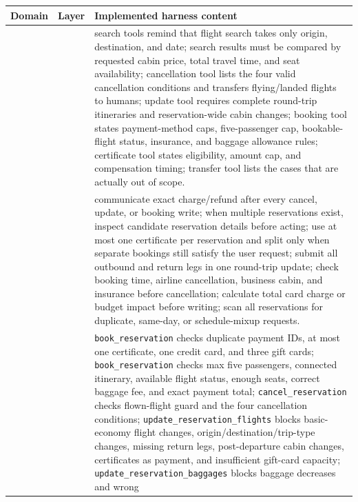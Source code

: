 \begin{table}[t]
\centering
\huge
\scriptsize
\setlength{\tabcolsep}{2.2pt}
\renewcommand{\arraystretch}{0.88}
\begin{tabular}{>{\centering\arraybackslash}m{}>{\centering\arraybackslash}m{}p{}}
\toprule
Domain & Layer & Implemented harness content \\
\midrule
\multirow{26}{*}{\centering Airline}
& \multirow{6}{*}{Environment Contract Layer}
& search tools remind that flight search takes only origin, destination, and date;
search results must be compared by requested cabin price, total travel time, and
seat availability; cancellation tool lists the four valid cancellation conditions
and transfers flying/landed flights to humans; update tool requires complete
round-trip itineraries and reservation-wide cabin changes; booking tool states
payment-method caps, five-passenger cap, bookable-flight status, insurance, and
baggage allowance rules; certificate tool states eligibility, amount cap, and
compensation timing; transfer tool lists the cases that are actually out of
scope. \\
\cmidrule(lr){2-3}
& \multirow{5}{*}{Procedural Skill Layer}
& communicate exact charge/refund after every cancel, update, or booking write;
when multiple reservations exist, inspect candidate reservation details before
acting; use at most one certificate per reservation and split only when separate
bookings still satisfy the user request; submit all outbound and return legs in
one round-trip update; check booking time, airline cancellation, business cabin,
and insurance before cancellation; calculate total card charge or budget impact
before writing; scan all reservations for duplicate, same-day, or schedule-mixup
requests. \\
\cmidrule(lr){2-3}
& \multirow{8}{*}{Action Realization Layer}
& \texttt{book\_reservation} checks duplicate payment IDs, at most one certificate, one
credit card, and three gift cards; \texttt{book\_reservation} checks max five passengers,
connected itinerary, available flight status, enough seats, correct baggage fee,
and exact payment total; \texttt{cancel\_reservation} checks flown-flight guard and the
four cancellation conditions; \texttt{update\_reservation\_flights} blocks basic-economy
flight changes, origin/destination/trip-type changes, missing return legs,
post-departure cabin changes, certificates as payment, and insufficient gift-card
capacity; \texttt{update\_reservation\_baggages} blocks baggage decreases and wrong

\end{tabular}
\end{table}
